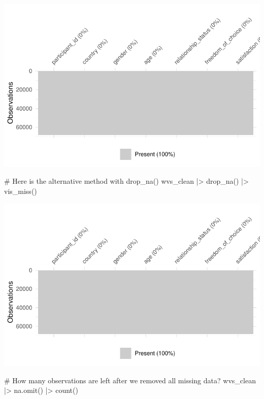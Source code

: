 \documentclass[
  letterpaper,
]{krantz}
\makeatletter
\newenvironment{Shaded}{\begin{snugshade}}{\end{snugshade}}
\newcommand{\CommentTok}[1]{\textcolor[rgb]{0.37,0.37,0.37}{#1}}
\newcommand{\FunctionTok}[1]{\textcolor[rgb]{0.28,0.35,0.67}{#1}}
\newcommand{\NormalTok}[1]{\textcolor[rgb]{0.00,0.23,0.31}{#1}}
\newcommand{\SpecialCharTok}[1]{\textcolor[rgb]{0.37,0.37,0.37}{#1}}
\newenvironment{kframe}{%
\medskip{}
\setlength{\fboxsep}{.8em}
 \def\at@end@of@kframe{}%
 \ifinner\ifhmode%
  \def\at@end@of@kframe{\end{minipage}}%
  \begin{minipage}{\columnwidth}%
 \fi\fi%
 \def\FrameCommand##1{\hskip\@totalleftmargin \hskip-\fboxsep
 \colorbox{shadecolor}{##1}\hskip-\fboxsep
     \hskip-\linewidth \hskip-\@totalleftmargin \hskip\columnwidth}%
 \MakeFramed {\advance\hsize-\width
   \@totalleftmargin\z@ \linewidth\hsize
   \@setminipage}}%
 {\par\unskip\endMakeFramed%
 \at@end@of@kframe}
\renewenvironment{Shaded}{\begin{kframe}}{\end{kframe}}
\makeatother
\begin{document}
\includegraphics{07_data_wrangling_files/figure-pdf/remove-all-missing-data-1.pdf}

\begin{Shaded}
\begin{Highlighting}[]
\CommentTok{\# Here is the alternative method with drop\_na()}
\NormalTok{wvs\_clean }\SpecialCharTok{|\textgreater{}} \FunctionTok{drop\_na}\NormalTok{() }\SpecialCharTok{|\textgreater{}} \FunctionTok{vis\_miss}\NormalTok{()}
\end{Highlighting}
\end{Shaded}

\includegraphics{07_data_wrangling_files/figure-pdf/alternative-of-removing-all-missing-data-points-1.pdf}

\begin{Shaded}
\begin{Highlighting}[]
\CommentTok{\# How many observations are left after we removed all missing data?}
\NormalTok{wvs\_clean }\SpecialCharTok{|\textgreater{}} \FunctionTok{na.omit}\NormalTok{() }\SpecialCharTok{|\textgreater{}} \FunctionTok{count}\NormalTok{()}
\end{Highlighting}
\end{Shaded}
\end{document}
